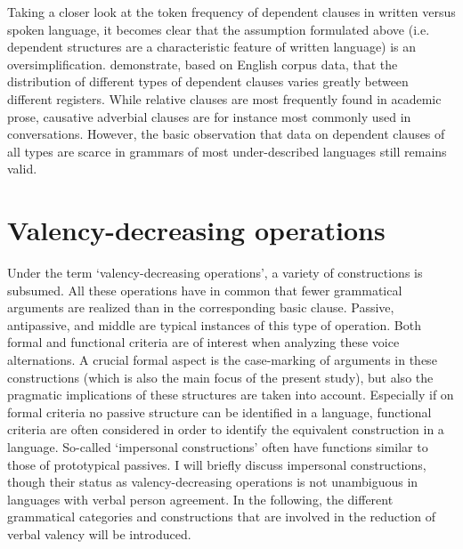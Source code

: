Taking a closer look at the token frequency of dependent clauses in written versus spoken language, it becomes clear that the assumption formulated above (i.e. dependent structures are a characteristic feature of written language) is an oversimplification. 
\citet[139--141]{Biber:1998} demonstrate, based on English corpus data, that the distribution of different types of dependent clauses varies greatly between different registers. 
While relative clauses are most frequently found in academic prose, causative adverbial clauses are for instance most commonly used in conversations. 
However, the basic observation that data on dependent clauses of all types are scarce in grammars of most under-described languages still remains valid.

\section{Valency-decreasing operations}\label{ValDec}

Under the term `valency-decreasing operations', a variety of constructions is subsumed.  
All these operations have in common that fewer grammatical arguments are realized than in the corresponding basic clause. 
Passive, antipassive, and middle are typical instances of this type of operation.
Both formal and functional criteria are of interest when analyzing these voice alternations. 
A crucial formal aspect is the case-marking of arguments in these constructions (which is also the main focus of the present study), but also the pragmatic implications of these structures are taken into account. 
Especially if on formal criteria no passive structure can be identified in a language, functional criteria are often considered in order to identify the equivalent construction in a language. 
So-called `impersonal constructions' often have functions similar to those of prototypical passives. 
I will briefly discuss impersonal constructions, though their status as valency-decreasing operations is not unambiguous in languages with verbal person agreement. 
In the following, the different grammatical categories and constructions that are involved in the reduction of verbal valency will be introduced. 
 
